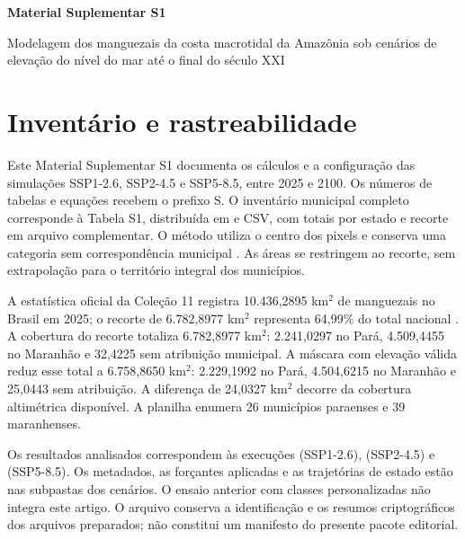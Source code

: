\documentclass[12pt,a4paper]{article}
\newcommand{\tituloPT}{Modelagem dos manguezais da costa macrotidal da Amazônia sob cenários de elevação do nível do mar até o final do século XXI}
\begin{document}
\begin{center}{\Large\bfseries Material Suplementar S1\par}\medskip
\tituloPT
\end{center}
\section{Inventário e rastreabilidade}
Este Material Suplementar S1 documenta os cálculos e a configuração das simulações SSP1-2.6, SSP2-4.5 e SSP5-8.5, entre 2025 e 2100. Os números de tabelas e equações recebem o prefixo S. O inventário municipal completo corresponde à Tabela S1, distribuída em  e CSV, com totais por estado e recorte em arquivo complementar. O método utiliza o centro dos pixels e conserva uma categoria sem correspondência municipal \citep{ibge2025,dados2026}. As áreas se restringem ao recorte, sem extrapolação para o território integral dos municípios.

A estatística oficial da Coleção 11 registra 10.436,2895 km$^2$ de manguezais no Brasil em 2025; o recorte de 6.782,8977 km$^2$ representa 64,99\% do total nacional \citep{mapbiomasareas2026}. A cobertura do recorte totaliza 6.782,8977 km$^2$: 2.241,0297 no Pará, 4.509,4455 no Maranhão e 32,4225 sem atribuição municipal. A máscara com elevação válida reduz esse total a 6.758,8650 km$^2$: 2.229,1992 no Pará, 4.504,6215 no Maranhão e 25,0443 sem atribuição. A diferença de 24,0327 km$^2$ decorre da cobertura altimétrica disponível. A planilha enumera 26 municípios paraenses e 39 maranhenses.

Os resultados analisados correspondem às execuções  (SSP1-2.6),  (SSP2-4.5) e  (SSP5-8.5). Os metadados, as forçantes aplicadas e as trajetórias de estado estão nas subpastas dos cenários. O ensaio anterior com classes personalizadas não integra este artigo. O arquivo  conserva a identificação e os resumos criptográficos dos arquivos preparados; não constitui um manifesto do presente pacote editorial.
\end{document}
